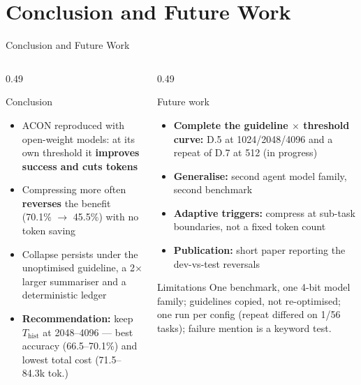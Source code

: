 \documentclass[aspectratio=169,10pt]{beamer}
\begin{document}
\section{Conclusion and Future Work}
\begin{frame}{Conclusion and Future Work}
\begin{columns}[T]
\begin{column}{0.49\textwidth}
\begin{block}{Conclusion}
\footnotesize
\begin{itemize}
  \item ACON reproduced with open-weight models: at its own threshold it
        \textbf{improves success and cuts tokens}
  \item Compressing more often \textbf{reverses} the benefit
        (70.1\% $\to$ 45.5\%) with no token saving
  \item Collapse persists under the unoptimised guideline, a 2$\times$ larger
        summariser and a deterministic ledger
  \item \textbf{Recommendation:} keep $T_{\mathrm{hist}}$ at 2048--4096 ---
        best accuracy (66.5--70.1\%) and lowest total cost (71.5--84.3k tok.)
\end{itemize}
\end{block}
\end{column}
\begin{column}{0.49\textwidth}
\begin{block}{Future work}
\footnotesize
\begin{itemize}
  \item \textbf{Complete the guideline $\times$ threshold curve:} D.5 at
        1024/2048/4096 and a repeat of D.7 at 512 (in progress)
  \item \textbf{Generalise:} second agent model family, second benchmark
  \item \textbf{Adaptive triggers:} compress at sub-task boundaries, not a
        fixed token count
  \item \textbf{Publication:} short paper reporting the dev-vs-test reversals
\end{itemize}
\end{block}
\begin{alertblock}{Limitations}
\footnotesize
One benchmark, one 4-bit model family; guidelines copied, not re-optimised;
one run per config (repeat differed on 1/56 tasks); failure mention is a keyword test.
\end{alertblock}
\end{column}
\end{columns}
\end{frame}
\end{document}
